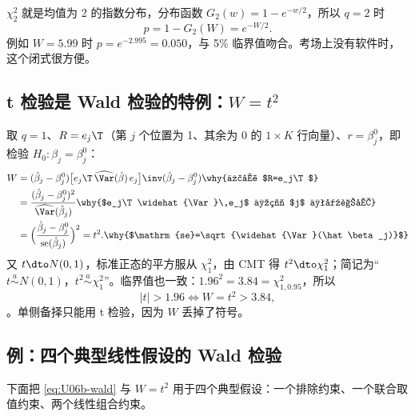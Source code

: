 $\chi^2_2$ 就是均值为 2 的指数分布，分布函数 $G_2(w)=1-e^{-w/2}$，所以 $q=2$ 时
\[
p=1-G_2(W)=e^{-W/2}.
\]
例如 $W=5.99$ 时 $p=e^{-2.995}=0.050$，与 5\% 临界值吻合。考场上没有软件时，这个闭式很方便。

\subsection{t 检验是 Wald 检验的特例：\texorpdfstring{$W=t^2$}{W = t squared}}\label{sec:U06b-wt2}

取 $q=1$、$R=e_j\T$（第 $j$ 个位置为 1、其余为 0 的 $1\times K$ 行向量）、$r=\beta_j^0$，即检验 $H_0:\beta_j=\beta_j^0$：
\begin{align*}
W&=(\hat\beta_j-\beta_j^0)\bigl[e_j\T\,\widehat{\Var}(\hat\beta)\,e_j\bigr]\inv(\hat\beta_j-\beta_j^0) \why{代入 $R=e_j\T$}\\
&=\frac{(\hat\beta_j-\beta_j^0)^2}{\widehat{\Var}(\hat\beta_j)} \why{$e_j\T\widehat{\Var}\,e_j$ 为第 $j$ 个对角元}\\
&=\Bigl(\frac{\hat\beta_j-\beta_j^0}{\mathrm{se}(\hat\beta_j)}\Bigr)^2=t^2 . \why{$\mathrm{se}=\sqrt{\widehat{\Var}(\hat\beta_j)}$}
\end{align*}
又 $t\dto N(0,1)$，标准正态的平方服从 $\chi^2_1$，由 CMT 得 $t^2\dto\chi^2_1$；简记为“$t\overset{a}{\sim}N(0,1)$，$t^2\overset{a}{\sim}\chi^2_1$”。临界值也一致：$1.96^2=3.84=\chi^2_{1,0.95}$，所以
\[
|t|>1.96\iff W=t^2>3.84 ,
\]
。单侧备择只能用 t 检验，因为 $W$ 丢掉了符号。

\subsection{例：四个典型线性假设的 Wald 检验}\label{sec:U06b-ex4}

下面把 \eqref{eq:U06b-wald} 与 $W=t^2$ 用于四个典型假设：一个排除约束、一个联合取值约束、两个线性组合约束。

